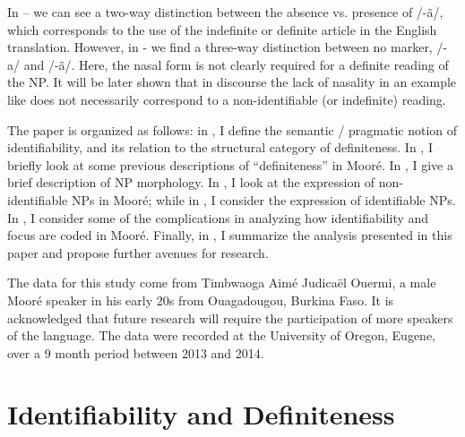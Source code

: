 \documentclass[output=paper]{langsci/langscibook}
\begin{document}
In – we can see a two-way distinction between the absence vs. presence of /-ã/, which corresponds to the use of the indefinite or definite article in the English translation. However, in - we find a three-way distinction between no marker, /-a/ and /-ã/. Here, the nasal form is not clearly required for a definite reading of the NP. It will be later shown that in discourse the lack of nasality in an example like  does not necessarily correspond to a non-identifiable (or indefinite) reading.

The paper is organized as follows: in , I define the semantic / pragmatic notion of identifiability, and its relation to the structural category of definiteness. In , I briefly look at some previous descriptions of “definiteness” in Mooré. In , I give a brief description of NP morphology. In , I look at the expression of non-identifiable NPs in Mooré; while in , I consider the expression of identifiable NPs. In , I consider some of the complications in analyzing how identifiability and focus are coded in Mooré. Finally, in , I summarize the analysis presented in this paper and propose further avenues for research.

The data for this study come from Timbwaoga Aimé Judicaël Ouermi, a male Mooré speaker in his early 20s from Ouagadougou, Burkina Faso. It is acknowledged that future research will require the participation of more speakers of the language. The data were recorded at the University of Oregon, Eugene, over a 9 month period between 2013 and 2014. 


\section{Identifiability and Definiteness}\label{sec:teo:2}
\end{document}
